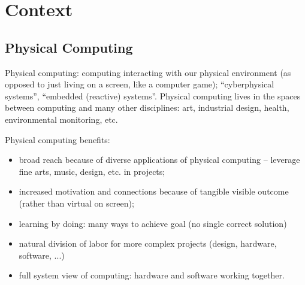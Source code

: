 \section{Context}
\label{sec:domain}

\subsection{Physical Computing}
Physical computing: computing interacting with our physical environment (as opposed to just
living on a screen, like a computer game); ``cyberphysical systems'', ``embedded (reactive) systems''.
Physical computing lives in the spaces between computing and many other disciplines:
art, industrial design, health, environmental monitoring, etc.


Physical computing benefits:
\begin{itemize}
\item broad reach because of diverse applications of physical computing -- leverage fine arts, music, design, etc. in projects;
\item increased motivation and connections because of tangible visible outcome (rather than virtual on screen);
\item learning by doing: many ways to achieve goal (no single correct solution)
\item natural division of labor for more complex projects (design, hardware, software, ...)
\item full system view of computing: hardware and software working together.
\end{itemize}


